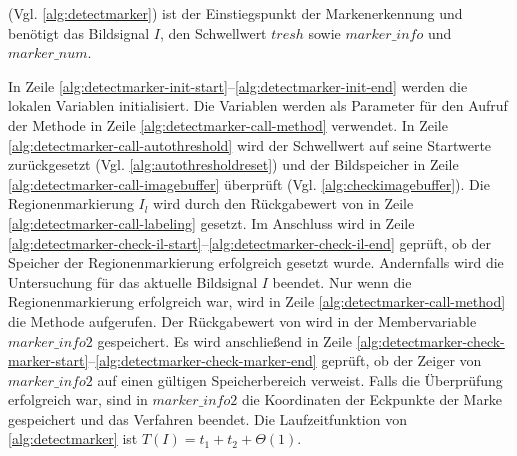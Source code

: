  (Vgl. \autoref{alg:detectmarker}) ist der Einstiegspunkt der Markenerkennung und benötigt das
 Bildsignal $I$, den Schwellwert $\mathit{tresh}$ sowie $\mathit{marker\_info}$ und $\mathit{marker\_num}$.

In Zeile \ref{alg:detectmarker-init-start}--\ref{alg:detectmarker-init-end} werden die lokalen Variablen initialisiert.
 Die Variablen werden als Parameter für den Aufruf der Methode  in Zeile
 \ref{alg:detectmarker-call-method} verwendet. In Zeile \ref{alg:detectmarker-call-autothreshold} wird der Schwellwert
 auf seine Startwerte zurückgesetzt (Vgl. \autoref{alg:autothresholdreset}) und der Bildspeicher in Zeile
 \ref{alg:detectmarker-call-imagebuffer} überprüft (Vgl. \autoref{alg:checkimagebuffer}). Die Regionenmarkierung $I_l$
 wird durch den Rückgabewert von  in Zeile \ref{alg:detectmarker-call-labeling} gesetzt. Im
 Anschluss wird in Zeile \ref{alg:detectmarker-check-il-start}--\ref{alg:detectmarker-check-il-end} geprüft, ob der
 Speicher der Regionenmarkierung erfolgreich gesetzt wurde. Andernfalls wird die Untersuchung für das aktuelle
 Bildsignal $I$ beendet. Nur wenn die Regionenmarkierung erfolgreich war, wird in Zeile
 \ref{alg:detectmarker-call-method} die Methode  aufgerufen. Der Rückgabewert von
  wird in der Membervariable $\mathit{marker\_info2}$ gespeichert. Es wird anschließend in
 Zeile \ref{alg:detectmarker-check-marker-start}--\ref{alg:detectmarker-check-marker-end} geprüft, ob der Zeiger von
 $\mathit{marker\_info2}$ auf einen gültigen Speicherbereich verweist. Falls die Überprüfung erfolgreich war, sind in
 $\mathit{marker\_info2}$ die Koordinaten der Eckpunkte der Marke gespeichert und das Verfahren beendet.
 Die Laufzeitfunktion von \autoref{alg:detectmarker} ist $T(I) = t_{1} + t_{2} + \Theta(1)$.



\clearpage



\clearpage
